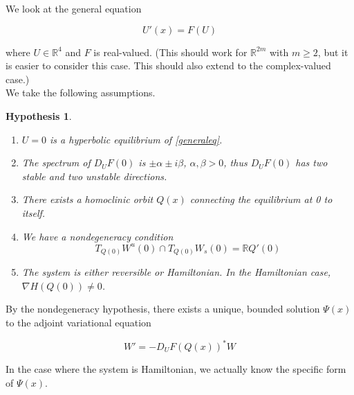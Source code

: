 \documentclass[12pt]{article}
\def\R{{\mathbb R}}
\newtheorem{hypothesis}{Hypothesis}
\begin{document}
We look at the general equation

\begin{equation}\label{generaleq}
U'(x) = F(U)
\end{equation}

where $U \in \R^4$ and $F$ is real-valued. (This should work for $\R^{2m}$ with $m \geq 2$, but it is easier to consider this case. This should also extend to the complex-valued case.)\\

We take the following assumptions.

\begin{hypothesis}\label{assumptions}
\[\]
\begin{enumerate}
	\item $U = 0$ is a hyperbolic equilibrium of \eqref{generaleq}.
	\item The spectrum of $D_U F(0)$ is $\pm \alpha \pm i \beta$, $\alpha, \beta > 0$, thus $D_U F(0)$ has two stable and two unstable directions.
	\item There exists a homoclinic orbit $Q(x)$ connecting the equilibrium at 0 to itself.
	\item We have a nondegeneracy condition
	\[
	T_{Q(0)} W^u(0) \cap T_{Q(0)} W_s(0) = \R Q'(0)
	\]
	\item The system is either reversible or Hamiltonian. In the Hamiltonian case, $\nabla H(Q(0)) \neq 0$.
\end{enumerate}
\end{hypothesis}

By the nondegeneracy hypothesis, there exists a unique, bounded solution $\Psi(x)$ to the adjoint variational equation

\begin{equation}
W' = -D_U F(Q(x))^* W
\end{equation}

In the case where the system is Hamiltonian, we actually know the specific form of $\Psi(x)$.

\end{document}
